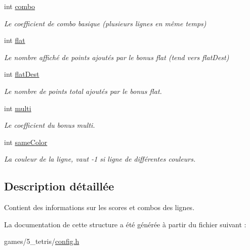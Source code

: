 \begin{DoxyCompactItemize}
\mbox{\label{structScore_a4cb3fe817072bbf8f876295d34726aed}} 
int \hyperlink{structScore_a4cb3fe817072bbf8f876295d34726aed}{combo}
\begin{DoxyCompactList}\small\item\em Le coefficient de combo basique (plusieurs lignes en même temps) \end{DoxyCompactList}\item 
\mbox{\label{structScore_ab04f214feff6f4910ab05d6be5994cf5}} 
int \hyperlink{structScore_ab04f214feff6f4910ab05d6be5994cf5}{flat}
\begin{DoxyCompactList}\small\item\em Le nombre affiché de points ajoutés par le bonus flat (tend vers flat\+Dest) \end{DoxyCompactList}\item 
\mbox{\label{structScore_a7dd918ca6fb07d3bb52179b50d9e0ff7}} 
int \hyperlink{structScore_a7dd918ca6fb07d3bb52179b50d9e0ff7}{flat\+Dest}
\begin{DoxyCompactList}\small\item\em Le nombre de points total ajoutés par le bonus flat. \end{DoxyCompactList}\item 
\mbox{\label{structScore_a75308cd0de4d855ff6cb9baec37dddde}} 
int \hyperlink{structScore_a75308cd0de4d855ff6cb9baec37dddde}{multi}
\begin{DoxyCompactList}\small\item\em Le coefficient du bonus multi. \end{DoxyCompactList}\item 
\mbox{\label{structScore_ad7b8a39f2ba1393617e5659a0268eb64}} 
int \hyperlink{structScore_ad7b8a39f2ba1393617e5659a0268eb64}{same\+Color}
\begin{DoxyCompactList}\small\item\em La couleur de la ligne, vaut -\/1 si ligne de différentes couleurs. \end{DoxyCompactList}\end{DoxyCompactItemize}


\subsection{Description détaillée}
Contient des informations sur les scores et combos des lignes. 

La documentation de cette structure a été générée à partir du fichier suivant \+:\begin{DoxyCompactItemize}
\item 
games/5\+\_\+tetris/\hyperlink{config_8h}{config.\+h}\end{DoxyCompactItemize}
